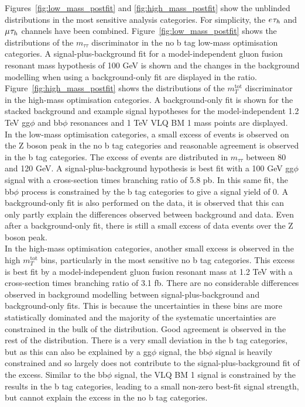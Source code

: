 Figures~\ref{fig:low_mass_postfit} and \ref{fig:high_mass_postfit} show the unblinded distributions in the most sensitive analysis categories.
For simplicity, the $e_{}\tau_{h}$ and $\mu_{}\tau_{h}$ channels have been combined.
Figure~\ref{fig:low_mass_postfit} shows the distributions of the $m_{\tau\tau}$ discriminator in the no b tag low-mass optimisation categories. 
A signal-plus-background fit for a model-independent gluon fusion resonant mass hypothesis of 100 GeV is shown and the changes in the background modelling when using a background-only fit are displayed in the ratio.
Figure~\ref{fig:high_mass_postfit} shows the distributions of the $m_{T}^{\text{tot}}$ discriminator in the high-mass optimisation categories.
A background-only fit is shown for the stacked background and example signal hypotheses for the model-independent 1.2 TeV gg$\phi$ and bb$\phi$ resonances and 1 TeV VLQ BM 1 mass points are displayed. \\

In the low-mass optimisation categories, a small excess of events is observed on the Z boson peak in the no b tag categories and reasonable agreement is observed in the b tag categories.
The excess of events are distributed in $m_{\tau\tau}$ between 80 and 120 GeV.
A signal-plus-background hypothesis is best fit with a 100 GeV gg$\phi$ signal with a cross-section times branching ratio of 5.8 pb. 
In this same fit, the bb$\phi$ process is constrained by the b tag categories to give a signal yield of 0.
A background-only fit is also performed on the data, it is observed that this can only partly explain the differences observed between background and data.
Even after a background-only fit, there is still a small excess of data events over the Z boson peak. \\

In the high-mass optimisation categories, another small excess is observed in the high $m_{T}^{\text{tot}}$ bins, particularly in the most sensitive no b tag categories.
This excess is best fit by a model-independent gluon fusion resonant mass at 1.2 TeV with a cross-section times branching ratio of 3.1 fb.
There are no considerable differences observed in background modelling between signal-plus-background and background-only fits.
This is because the uncertainties in these bins are more statistically dominated and the majority of the systematic uncertainties are constrained in the bulk of the distribution.
Good agreement is observed in the rest of the distribution.
There is a very small deviation in the b tag categories, but as this can also be explained by a gg$\phi$ signal, the bb$\phi$ signal is heavily constrained and so largely does not contribute to the signal-plus-background fit of the excess.
Similar to the bb$\phi$ signal, the VLQ BM 1 signal is constrained by the results in the b tag categories, leading to a small non-zero best-fit signal strength, but cannot explain the excess in the no b tag categories. \\

